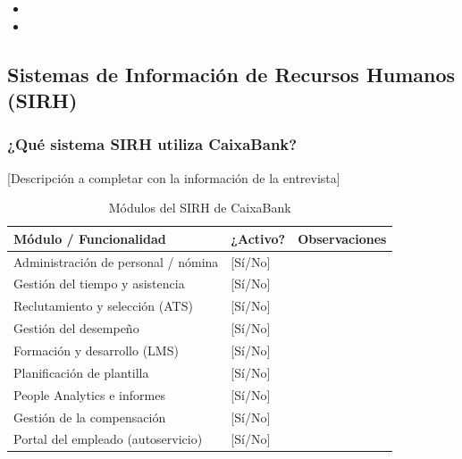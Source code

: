 \begin{itemize}
  \item [Propuesta 1 — justificación]
  \item [Propuesta 2 — justificación]
\end{itemize}

\subsection{Sistemas de Información de Recursos Humanos (SIRH)}

\subsubsection{¿Qué sistema SIRH utiliza CaixaBank?}


[Descripción a completar con la información de la entrevista]

\begin{table}[H]
  \centering
  \small
  \caption{Módulos del SIRH de CaixaBank}
  \begin{tabularx}{\textwidth}{p{} p{} X}
    \toprule
    \textbf{Módulo / Funcionalidad}          & \textbf{¿Activo?} & \textbf{Observaciones} \\
    \midrule
    Administración de personal / nómina       & [Sí/No] & \\
    Gestión del tiempo y asistencia           & [Sí/No] & \\
    Reclutamiento y selección (ATS)           & [Sí/No] & \\
    Gestión del desempeño                     & [Sí/No] & \\
    Formación y desarrollo (LMS)              & [Sí/No] & \\
    Planificación de plantilla                & [Sí/No] & \\
    People Analytics e informes               & [Sí/No] & \\
    Gestión de la compensación                & [Sí/No] & \\
    Portal del empleado (autoservicio)        & [Sí/No] & \\
    \bottomrule
  \end{tabularx}
\end{table}

